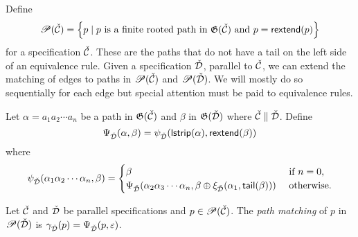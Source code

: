 Define
\[
    \mathscr{P}(\check{\mathcal{C}}) = \left\{p \mid p \text{ is a finite rooted path in } \mathfrak{G}(\check{\mathcal{C}}) \text{ and }p = \textsf{rextend}(p)\right\}
\]
for a specification $\check{\mathcal{C}}$. These are the paths that do not have a tail on the left side of an equivalence rule. Given a specification $\check{\mathcal{D}}$, parallel to $\check{\mathcal{C}}$, we can extend the matching of edges to paths in $\mathscr{P}(\check{\mathcal{C}})$ and $\mathscr{P}(\check{\mathcal{D}})$. We will mostly do so sequentially for each edge but special attention must be paid to equivalence rules.

Let $\alpha = a_1a_2 \dotsm a_n$ be a path in $\mathfrak{G}(\check{\mathcal{C}})$ and $\beta$ in $\mathfrak{G}(\check{\mathcal{D}})$ where $\check{\mathcal{C}} \parallel \check{\mathcal{D}}$. Define
\[
    \Psi_{\check{\mathcal{D}}}(\alpha,\beta) = \psi_{\check{\mathcal{D}}}(\textsf{lstrip}(\alpha),\textsf{rextend}(\beta)) 
\]
where
\[
    \psi_{\check{\mathcal{D}}}(\alpha_1\alpha_2\dotsm\alpha_n,\beta) = \begin{cases}
        \beta & \text{ if } n = 0,\\
        \Psi_{\check{\mathcal{D}}}(\alpha_2\alpha_3\dotsm\alpha_n, \beta \oplus \xi_{\check{\mathcal{D}}}(\alpha_1,\textsf{tail}(\beta))) & \text{ otherwise}.
    \end{cases}
\]

\begin{definition}\label{def:pathmatch}
Let $\check{\mathcal{C}}$ and $\check{\mathcal{D}}$ be parallel specifications and $p \in \mathscr{P}(\check{\mathcal{C}})$. The \emph{path matching} of $p$ in $\mathscr{P}(\check{\mathcal{D}})$ is $\gamma_{\check{\mathcal{D}}}(p) = \Psi_{\check{\mathcal{D}}}(p,\varepsilon)$.
\end{definition}

